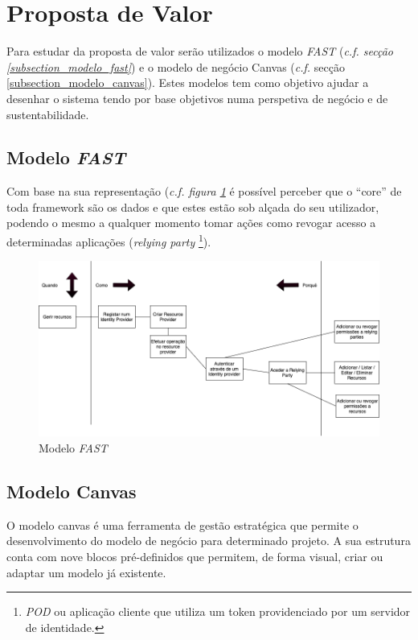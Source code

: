 \section{Proposta de Valor \label{section_proposta_de_valor}}
Para estudar da proposta de valor serão utilizados o modelo \emph{\acrshort{FAST}} (\emph{c.f. secção \ref{subsection_modelo_fast}}) e o modelo de negócio Canvas (\emph{c.f.} secção \ref{subsection_modelo_canvas}).
Estes modelos tem como objetivo ajudar a desenhar o sistema tendo por base objetivos numa perspetiva de negócio e de sustentabilidade.

\subsection{Modelo \emph{\acrshort{FAST}}\label{subsection_modelo_fast}}
Com base na sua representação (\emph{c.f. figura \ref{figura_modelo_fast}} é possível perceber que o “core” de toda framework são os dados e que estes estão sob alçada do seu utilizador, podendo o mesmo a qualquer momento tomar ações como revogar acesso a determinadas aplicações (\emph{relying party} \footnote{\emph{\acrshort{POD}} ou aplicação cliente que utiliza um token providenciado por um servidor de identidade.}).

\begin{figure}[H]
    \begin{center}
    \includegraphics[height=0.4\textwidth]{figures/Canvas-FAST.png}
    \caption{Modelo \emph{\acrshort{FAST}}}
    \label{figura_modelo_fast}
    \end{center}
\end{figure}

\subsection{Modelo Canvas\label{subsection_modelo_canvas}}
O modelo canvas é uma ferramenta de gestão estratégica que permite o desenvolvimento do modelo de negócio para determinado projeto. A sua estrutura conta com nove blocos pré-definidos que permitem, de forma visual, criar ou adaptar um modelo já existente\cite{alexander:2006}.

